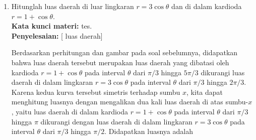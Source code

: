 \documentclass[10pt,openany,a4paper]{article}
\theoremstyle{definition}
\theoremstyle{definition}
\theoremstyle{plain}
\newenvironment{jawab}[2][tes]{
\textbf{Kata kunci materi:} #1.\\
\textbf{Penyelesaian:} #2
}{}
\newenvironment{jawaban}[2][tes]{
\colorlet{oldcolor}{.}
        \color{red}
        \setlength{\fboxrule}{1pt}\boxed{\color{oldcolor}#2}\color{oldcolor}.
}{}
\begin{document}
\begin{enumerate}
\begin{jawab}
{\begin{align*}
&= \int_0^{\pi/3} 3 + 4\cos (2\theta) - 2\cos \theta \, d\theta\\
&= \left[3\theta + 2\sin (2\theta) - 2\sin \theta\right]_0^{\pi/3}\\
&= \left(3\cdot \frac{\pi}{3} + 2\cdot \frac{\sqrt{3}}{2} - 2\cdot \frac{\sqrt{3}}{2}\right) - \left(0 + 0 - 0\right)\\
&= \begin{jawaban}{\pi}\end{jawaban}
\end{align*}
                }
            \end{jawab}
            \item Hitunglah luas daerah di luar lingkaran $r=3\cos\theta$ dan di dalam kardioda $r=1+\cos\theta$.\\
            \begin{jawab}
                [luas daerah]{
                Berdasarkan perhitungan dan gambar pada soal sebelumnya, didapatkan bahwa luas daerah tersebut merupakan luas daerah yang dibatasi oleh kardioda $r=1+\cos\theta$ pada interval $\theta$ dari $\pi/3$ hingga $5\pi/3$ dikurangi luas daerah di dalam lingkaran $r=3\cos\theta$ pada interval $\theta$ dari $\pi/3$ hingga $2\pi/3$. Karena kedua kurva tersebut simetris terhadap sumbu $x$, kita dapat menghitung luasnya dengan mengalikan dua kali luas daerah di atas sumbu-$x$, yaitu luas daerah di dalam kardioda $r=1+\cos\theta$ pada interval $\theta$ dari $\pi/3$ hingga $\pi$ dikurangi dengan luas daerah di dalam lingkaran $r=3\cos\theta$ pada interval $\theta$ dari $\pi/3$ hingga $\pi/2$. Didapatkan luasnya adalah
            \begin{center}
\end{center}}
\end{jawab}
\end{enumerate}
\end{document}
